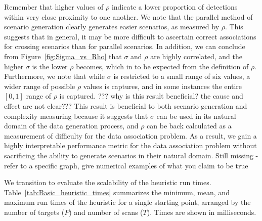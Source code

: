 Remember that higher values of $\rho$ indicate a lower proportion of detections within very close proximity to one another. We note that the parallel method of scenario generation clearly generates easier scenarios, as measured by $\rho$. This suggests that in general, it may be more difficult to ascertain correct associations for crossing scenarios than for parallel scenarios. In addition, we can conclude from Figure~\ref{fig:Sigma_vs_Rho} that $\sigma$ and $\rho$ are {\color{red}highly correlated, and the higher $\sigma$ is the lower $\rho$ becomes, which in to be expected from the definition of $\rho$}. Furthermore, we note that {\color{red}  while $\sigma$ is restricted to a small range of six values, a wider range of possible $\rho$ values is captures, and in some instances the entire $[0,1]$ range of $\rho$ is captured. ??? why is this result beneficial? the cause and effect are not clear??? This result is beneficial to both scenario generation and complexity measuring because it suggests that $\sigma$ can be used in its natural domain of the data generation process, and $\rho$ can be back calculated as a measurement of difficulty for the data association problem.} As a result, we gain a highly interpretable performance metric for the data association problem without sacrificing the ability to generate scenarios in their natural domain.  {\color{red} Still missing - refer to a specific graph, give numerical examples of what you claim to be true}

We transition to evaluate the scalability of the heuristic run times. Table~\ref{tab:Basic_heuristic_times} summarizes the minimum, mean, and maximum run times of the heuristic for a single starting point, arranged by the number of targets ($P$) and number of scans ($T$). Times are shown in milliseconds. 

